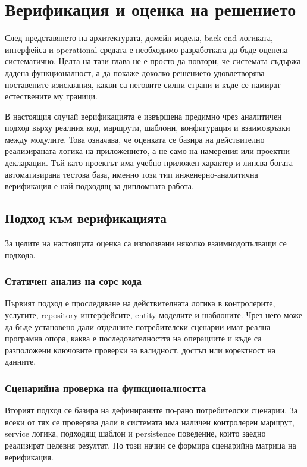 \section{Верификация и оценка на решението}

След представянето на архитектурата, домейн модела, back-end логиката, интерфейса и operational средата е необходимо разработката да бъде оценена систематично. Целта на тази глава не е просто да повтори, че системата съдържа дадена функционалност, а да покаже доколко решението удовлетворява поставените изисквания, какви са неговите силни страни и къде се намират естествените му граници.

В настоящия случай верификацията е извършена предимно чрез аналитичен подход върху реалния код, маршрути, шаблони, конфигурация и взаимовръзки между модулите. Това означава, че оценката се базира на действително реализираната логика на приложението, а не само на намерения или проектни декларации. Тъй като проектът има учебно-приложен характер и липсва богата автоматизирана тестова база, именно този тип инженерно-аналитична верификация е най-подходящ за дипломната работа.

\subsection{Подход към верификацията}

За целите на настоящата оценка са използвани няколко взаимнодопълващи се подхода.

\subsubsection{Статичен анализ на сорс кода}

Първият подход е проследяване на действителната логика в контролерите, услугите, repository интерфейсите, entity моделите и шаблоните. Чрез него може да бъде установено дали отделните потребителски сценарии имат реална програмна опора, каква е последователността на операциите и къде са разположени ключовите проверки за валидност, достъп или коректност на данните.

\subsubsection{Сценарийна проверка на функционалността}

Вторият подход се базира на дефинираните по-рано потребителски сценарии. За всеки от тях се проверява дали в системата има наличен контролерен маршрут, service логика, подходящ шаблон и persistence поведение, които заедно реализират целевия резултат. По този начин се формира сценарийна матрица на верификация.

